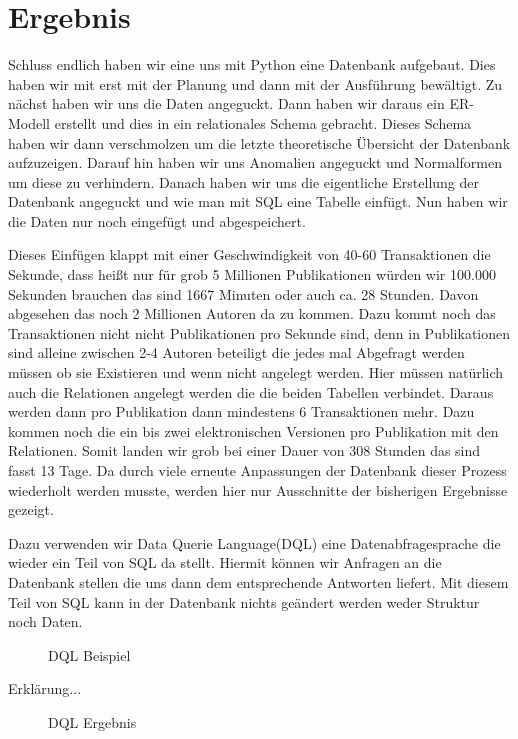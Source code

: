 \section{Ergebnis}
Schluss endlich haben wir eine uns mit Python eine Datenbank aufgebaut. Dies haben wir mit erst mit der Planung und dann mit der Ausführung bewältigt. Zu nächst haben wir uns die Daten angeguckt. Dann haben wir daraus ein ER-Modell erstellt und dies in ein relationales Schema gebracht. Dieses Schema haben wir dann verschmolzen um die letzte theoretische Übersicht der Datenbank aufzuzeigen. Darauf hin haben wir uns Anomalien angeguckt und Normalformen um diese zu verhindern. Danach haben wir uns die eigentliche Erstellung der Datenbank angeguckt und wie man mit SQL eine Tabelle einfügt. Nun haben wir die Daten nur noch eingefügt und abgespeichert. 

Dieses Einfügen klappt mit einer Geschwindigkeit von 40-60 Transaktionen die Sekunde, dass heißt nur für grob 5 Millionen Publikationen würden wir 100.000 Sekunden brauchen das sind 1667 Minuten oder auch ca. 28 Stunden. Davon abgesehen das noch 2 Millionen Autoren da zu kommen. Dazu kommt noch das Transaktionen nicht nicht Publikationen pro Sekunde sind, denn in Publikationen sind alleine zwischen 2-4 Autoren beteiligt die jedes mal Abgefragt werden müssen ob sie Existieren und wenn nicht angelegt werden. Hier müssen natürlich auch die Relationen angelegt werden die die beiden Tabellen verbindet. Daraus werden dann pro Publikation dann mindestens 6 Transaktionen mehr. Dazu kommen noch die ein bis zwei elektronischen Versionen pro Publikation mit den Relationen. Somit landen wir grob bei einer Dauer von 308 Stunden das sind fasst 13 Tage. Da durch viele erneute Anpassungen der Datenbank dieser Prozess wiederholt werden musste, werden hier nur Ausschnitte der bisherigen Ergebnisse gezeigt. 

Dazu verwenden wir Data Querie Language(DQL) eine Datenabfragesprache die wieder ein Teil von SQL da stellt. Hiermit können wir Anfragen an die Datenbank stellen die uns dann dem entsprechende Antworten liefert. Mit diesem Teil von SQL kann in der Datenbank nichts geändert werden weder Struktur noch Daten.

\begin{figure}[!htb]
	\centering
	\caption{DQL Beispiel}
	\label{fig:dqlbeispiel}
\end{figure}

Erklärung...%

\begin{figure}[!htb]
	\centering
	\caption{DQL Ergebnis}
	\label{fig:dqlergebnis}
\end{figure}